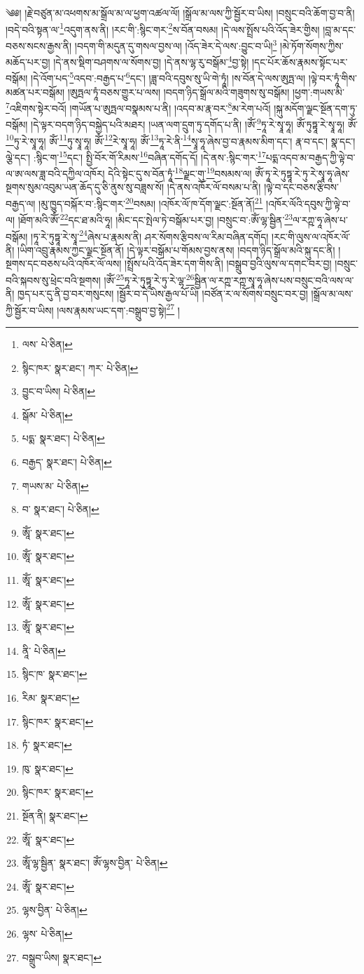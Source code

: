 \setcounter{footnote}{0} 
༄༅། །རྗེ་བཙུན་མ་འཕགས་མ་སྒྲོལ་མ་ལ་ཕྱག་འཚལ་ལོ། །སྒྲོལ་མ་ལས་ཀྱི་སྦྱོར་བ་ཡིས། །བསྲུང་བའི་ཆོག་བྱ་བ་ནི། །བདེ་བའི་སྟན་ལ་\footnote{ལས་  པེ་ཅིན། }འདུག་ནས་ནི། །རང་གི་:སྙིང་གར་\footnote{སྙིང་ཁར་  སྣར་ཐང་། ཀར་  པེ་ཅིན། }ས་བོན་བསམ། །དེ་ལས་སྤྲོས་པའི་འོད་ཟེར་གྱིས། །བླ་མ་དང་བཅས་སངས་རྒྱས་ནི། །བདག་གི་མདུན་དུ་གསལ་བྱས་ལ། །འོད་ཟེར་དེ་ལས་:བྱུང་བ་ཡི།\footnote{བྱུང་བ་ཡིས།  པེ་ཅིན། } །མེ་ཏོག་སོགས་ཀྱིས་མཆོད་པར་བྱ། །དེ་ནས་སྡིག་བཤགས་ལ་སོགས་བྱ། །དེ་ནས་ལྷ་རུ་བསྒོམ་\footnote{སྒོམ་  པེ་ཅིན། }བྱ་སྟེ། །དང་པོར་ཆོས་རྣམས་སྟོང་པར་བསྒོམ། །དེ་འོག་པད་\footnote{པདྨ་  སྣར་ཐང་།  པེ་ཅིན། }འདབ་:བརྒྱད་པ་\footnote{བརྒྱད་  སྣར་ཐང་།  པེ་ཅིན། }དང་། །ཟླ་བའི་དབུས་སུ་ཡི་གེ་ཏཱཾ། །ས་བོན་དེ་ལས་ཨུཏྤ་ལ། །ལྟེ་བར་ཏཱཾ་གིས་མཚན་པར་བསྒོམ། །ཨུཏྤལ་ཏཱཾ་བཅས་གྱུར་པ་ལས། །བདག་ཉིད་སྒྲོལ་མའི་གཟུགས་སུ་བསྒོམ། །ཕྱག་:གཡས་མི་\footnote{གཡས་མ་  པེ་ཅིན། }འཇིགས་སྟེར་བའོ། །གཡོན་པ་ཨུཏྤལ་བསྣམས་པ་ནི། །འདབ་མ་རྣ་བར་\footnote{བ་  སྣར་ཐང་།  པེ་ཅིན། }མ་རེག་པའོ། །སྐུ་མདོག་ལྗང་སྔོན་དག་ཏུ་བསྒོམ། །དེ་ལྟར་བདག་ཉིད་བསྐྱེད་པའི་མཐར། །ཡན་ལག་དྲུག་ཏུ་དགོད་པ་ནི། །ཨོཾ་\footnote{ཨཱོཾ་  སྣར་ཐང་། }ཏཱ་རེ་སྭཱ་ཧཱ། ཨོཾ་ཏུཏྟཱ་རེ་སྭཱ་ཧཱ། ཨོཾ་\footnote{ཨཱོཾ་  སྣར་ཐང་། }ཏུ་རེ་སྭཱ་ཧཱ། ཨོཾ་\footnote{ཨཱོཾ་  སྣར་ཐང་། }ཏུ་སྭཱ་ཧཱ། ཨོཾ་\footnote{ཨཱོཾ་  སྣར་ཐང་། }རེ་སྭཱ་ཧཱ། ཨོཾ་\footnote{ཨཱོཾ་  སྣར་ཐང་། }ཏཱ་རེ་ནི་\footnote{ནཱི་  པེ་ཅིན། }སྭཱ་ཧཱ་ཞེས་བྱ་བ་རྣམས་མིག་དང་། རྣ་བ་དང་། སྣ་དང་། ལྕེ་དང་། :སྙིང་ག་\footnote{སྙིང་ཁ་  སྣར་ཐང་། }དང་། སྤྱི་བོར་གོ་རིམས་\footnote{རིམ་  སྣར་ཐང་། }བཞིན་དགོད་དོ། །དེ་ནས་:སྙིང་གར་\footnote{སྙིང་ཁར་  སྣར་ཐང་། }པདྨ་འདབ་མ་བརྒྱད་ཀྱི་ལྟེ་བ་ལ་ཨ་ལས་ཟླ་བའི་དཀྱིལ་འཁོར། དེའི་སྟེང་དུ་ས་བོན་ཏཱཾ་\footnote{ཏཾ་  སྣར་ཐང་། }ལྗང་གུ་\footnote{ཁུ་  སྣར་ཐང་། }བསམས་ལ། ཨོཾ་ཏཱ་རེ་ཏུཏྟཱ་རེ་ཏུ་རེ་སྭཱ་ཧཱ་ཞེས་སྔགས་སུམ་འབུམ་ཡན་ཆོད་དུ་ཅི་ནུས་སུ་བཟླས་སོ། །དེ་ནས་འཁོར་ལོ་བསམ་པ་ནི། །ལྟེ་བ་དང་བཅས་རྩིབས་བརྒྱད་ལ། །མུ་ཁྱུད་བསྐོར་བ་:སྙིང་གར་\footnote{སྙིང་ཁར་  སྣར་ཐང་། }བསམ། །འཁོར་ལོ་ཁ་དོག་ལྗང་:སྔོན་ནོ།\footnote{སྔོན་ནི།  སྣར་ཐང་། } །འཁོར་ལོའི་དབུས་ཀྱི་ལྟེ་བ་ལ། །ཐོག་མའི་ཨོཾ་\footnote{ཨཱོཾ་  སྣར་ཐང་། }དང་ཐ་མའི་ཧཱ། །མིང་དང་སྤེལ་ཏེ་བསྒོམ་པར་བྱ། །བསྲུང་བ་:ཨོཾ་ལྷ་སྦྱིན་\footnote{ཨཱོཾ་ལྷ་སྦྱིན་  སྣར་ཐང་། ཨོཾ་ལྷས་བྱིན་  པེ་ཅིན། }ལ་རཀྵ་ཧཱ་ཞེས་པ་བསྒོམ། །ཏཱ་རེ་ཏུཏྟཱ་རེ་སྭཱ་\footnote{ཨཱོཾ་  སྣར་ཐང་། }ཞེས་པ་རྣམས་ནི། ཤར་སོགས་རྩིབས་ལ་རིམ་བཞིན་དགོད། །རང་གི་ལུས་ལ་འཁོར་ལོ་ནི། །ཡིག་འབྲུ་རྣམས་ཀྱང་ལྗང་སྔོན་ནོ། །དེ་ལྟར་བསྒོམ་པ་གོམས་བྱས་ནས། །བདག་ཉིད་སྒྲོལ་མའི་སྐུ་དང་ནི། །སྔགས་དང་བཅས་པའི་འཁོར་ལོ་ལས། །སྤྲོས་པའི་འོད་ཟེར་དག་གིས་ནི། །བསྒྲུབ་བྱའི་ལུས་ལ་དགང་བར་བྱ། །བསྲུང་བའི་སྐབས་སུ་ཕྲེང་བའི་སྔགས། །ཨོཾ་\footnote{ལྷས་བྱིན་  པེ་ཅིན། }ཏཱ་རེ་ཏུཏྟཱ་རེ་ཏུ་རེ་ལྷ་\footnote{ལྷས་  པེ་ཅིན། }སྦྱིན་ལ་རཀྵ་རཀྵ་སྭཱ་ཧཱ་ཞེས་པས་བསྲུང་བའི་ལས་ལ་ནི། ཁྱད་པར་དུ་ནི་བྱ་བར་གསུངས། །སྦྱོར་བ་དེ་ཡིས་རྒྱལ་པོ་ཡི། །བཙོན་ར་ལ་སོགས་བསྲུང་བར་བྱ། །སྒྲོལ་མ་ལས་ཀྱི་སྦྱོར་བ་ཡིས། །ལས་རྣམས་ཡང་དག་:བསྒྲུབ་བྱ་སྟེ།\footnote{བསྒྲུབ་ཡིས།  སྣར་ཐང་། } །
